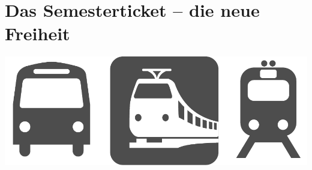 \section{Das Semesterticket -- die neue Freiheit}

\begin{center}
	\includegraphics[width=\textwidth, height=0.22\textheight]{res/bus_und_bahn.pdf}
\end{center}

